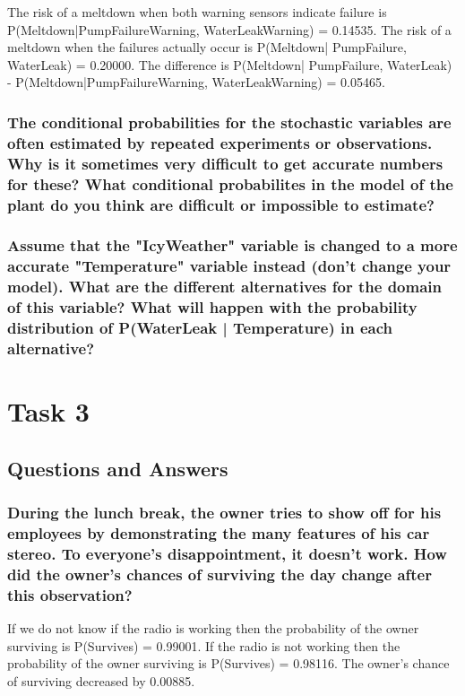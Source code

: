 \documentclass[a4paper,10pt]{article}
\begin{document}
The risk of a meltdown when both warning sensors indicate failure is P(Meltdown|PumpFailureWarning, WaterLeakWarning) = 0.14535.
The risk of a meltdown when the failures actually occur is P(Meltdown| PumpFailure, WaterLeak) = 0.20000.
The difference is P(Meltdown| PumpFailure, WaterLeak) - P(Meltdown|PumpFailureWarning, WaterLeakWarning) = 0.05465.

\subsubsection{The conditional probabilities for the stochastic variables are often estimated by repeated experiments or observations. 
Why is it sometimes very difficult to get accurate numbers for these? 
What conditional probabilites in the model of the plant do you think are difficult or impossible to estimate? }

\subsubsection{Assume that the "IcyWeather" variable is changed to a more accurate "Temperature" variable instead (don't change your model). 
What are the different alternatives for the domain of this variable? 
What will happen with the probability distribution of P(WaterLeak | Temperature) in each alternative?}

\section{Task 3}

\subsection{Questions and Answers}

\subsubsection{During the lunch break, the owner tries to show off for his employees by demonstrating the many features of his car stereo.
 To everyone's disappointment, it doesn't work. 
 How did the owner's chances of surviving the day change after this observation?}

 If we do not know if the radio is working then the probability of the owner surviving is P(Survives) = 0.99001.
 If the radio is not working then the probability of the owner surviving is P(Survives) = 0.98116.
 The owner's chance of surviving decreased by 0.00885.
\end{document}

